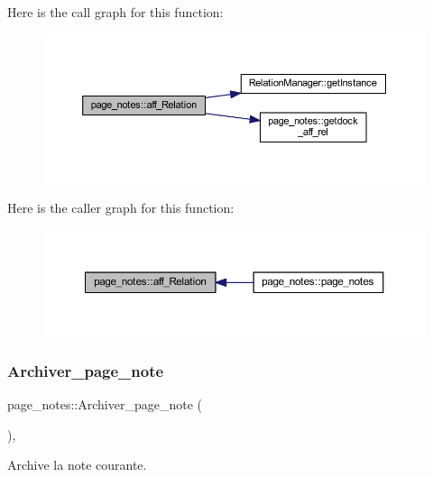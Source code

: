Here is the call graph for this function\+:\nopagebreak
\begin{figure}[H]
\begin{center}
\leavevmode
\includegraphics[width=350pt]{classpage__notes_a5c00719607b3e0f3a78c3b35b6df4df9_cgraph}
\end{center}
\end{figure}
Here is the caller graph for this function\+:\nopagebreak
\begin{figure}[H]
\begin{center}
\leavevmode
\includegraphics[width=350pt]{classpage__notes_a5c00719607b3e0f3a78c3b35b6df4df9_icgraph}
\end{center}
\end{figure}
\mbox{\label{classpage__notes_a8d23f8f379d4aa402193f589ac3e4afa}} 
\subsubsection{\texorpdfstring{Archiver\+\_\+page\+\_\+note}{Archiver\_page\_note}}
{\footnotesize\ttfamily page\+\_\+notes\+::\+Archiver\+\_\+page\+\_\+note (\begin{DoxyParamCaption}{ }\end{DoxyParamCaption})\hspace{0.3cm}{\ttfamily [inline]}, {\ttfamily [slot]}}



Archive la note courante. 

